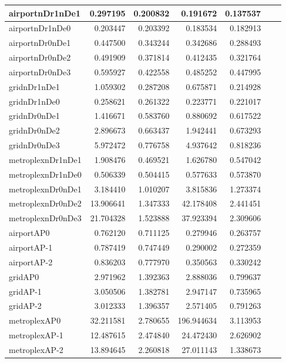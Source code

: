 \documentclass[../../../thesis.tex]{subfiles}
\begin{document}
\begin{longtable}{|l|r|r|r|r|r|r|}
\endlastfoot
airportnDr1nDe1 & 0.297195 & 0.200832 & 0.191672 & 0.137537 \\ \hline
airportnDr1nDe0 & 0.203447 & 0.203392 & 0.183534 & 0.182913 \\ \hline
airportnDr0nDe1 & 0.447500 & 0.343244 & 0.342686 & 0.288493 \\ \hline
airportnDr0nDe2 & 0.491909 & 0.371814 & 0.412435 & 0.321764 \\ \hline
airportnDr0nDe3 & 0.595927 & 0.422558 & 0.485252 & 0.447995 \\ \hline
gridnDr1nDe1 & 1.059302 & 0.287208 & 0.675871 & 0.214928 \\ \hline
gridnDr1nDe0 & 0.258621 & 0.261322 & 0.223771 & 0.221017 \\ \hline
gridnDr0nDe1 & 1.416671 & 0.583760 & 0.880692 & 0.617522 \\ \hline
gridnDr0nDe2 & 2.896673 & 0.663437 & 1.942441 & 0.673293 \\ \hline
gridnDr0nDe3 & 5.972472 & 0.776758 & 4.937642 & 0.818236 \\ \hline
metroplexnDr1nDe1 & 1.908476 & 0.469521 & 1.626780 & 0.547042 \\ \hline
metroplexnDr1nDe0 & 0.506339 & 0.504415 & 0.577633 & 0.573870 \\ \hline
metroplexnDr0nDe1 & 3.184410 & 1.010207 & 3.815836 & 1.273374 \\ \hline
metroplexnDr0nDe2 & 13.906641 & 1.347333 & 42.178408 & 2.441451 \\ \hline
metroplexnDr0nDe3 & 21.704328 & 1.523888 & 37.923394 & 2.309606 \\ \hline
airportAP0 & 0.762120 & 0.711125 & 0.279946 & 0.263757 \\ \hline
airportAP-1 & 0.787419 & 0.747449 & 0.290002 & 0.272359 \\ \hline
airportAP-2 & 0.836203 & 0.777970 & 0.350563 & 0.330242 \\ \hline
gridAP0 & 2.971962 & 1.392363 & 2.888036 & 0.799637 \\ \hline
gridAP-1 & 3.050506 & 1.382781 & 2.947147 & 0.735965 \\ \hline
gridAP-2 & 3.012333 & 1.396357 & 2.571405 & 0.791263 \\ \hline
metroplexAP0 & 32.211581 & 2.780655 & 196.944634 & 3.113953 \\ \hline
metroplexAP-1 & 12.487615 & 2.474840 & 24.472430 & 2.626902 \\ \hline
metroplexAP-2 & 13.894645 & 2.260818 & 27.011143 & 1.338673 \\ \hline

\end{longtable}
\end{document}
